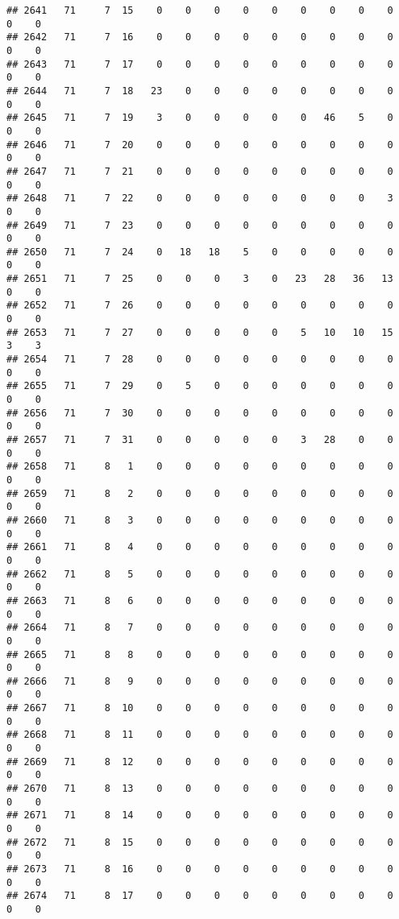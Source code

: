 \documentclass[]{article}
\begin{document}
\begin{verbatim}
## 2641   71     7  15    0    0    0    0    0    0    0    0    0    0    0
## 2642   71     7  16    0    0    0    0    0    0    0    0    0    0    0
## 2643   71     7  17    0    0    0    0    0    0    0    0    0    0    0
## 2644   71     7  18   23    0    0    0    0    0    0    0    0    0    0
## 2645   71     7  19    3    0    0    0    0    0   46    5    0    0    0
## 2646   71     7  20    0    0    0    0    0    0    0    0    0    0    0
## 2647   71     7  21    0    0    0    0    0    0    0    0    0    0    0
## 2648   71     7  22    0    0    0    0    0    0    0    0    3    0    0
## 2649   71     7  23    0    0    0    0    0    0    0    0    0    0    0
## 2650   71     7  24    0   18   18    5    0    0    0    0    0    0    0
## 2651   71     7  25    0    0    0    3    0   23   28   36   13    0    0
## 2652   71     7  26    0    0    0    0    0    0    0    0    0    0    0
## 2653   71     7  27    0    0    0    0    0    5   10   10   15    3    3
## 2654   71     7  28    0    0    0    0    0    0    0    0    0    0    0
## 2655   71     7  29    0    5    0    0    0    0    0    0    0    0    0
## 2656   71     7  30    0    0    0    0    0    0    0    0    0    0    0
## 2657   71     7  31    0    0    0    0    0    3   28    0    0    0    0
## 2658   71     8   1    0    0    0    0    0    0    0    0    0    0    0
## 2659   71     8   2    0    0    0    0    0    0    0    0    0    0    0
## 2660   71     8   3    0    0    0    0    0    0    0    0    0    0    0
## 2661   71     8   4    0    0    0    0    0    0    0    0    0    0    0
## 2662   71     8   5    0    0    0    0    0    0    0    0    0    0    0
## 2663   71     8   6    0    0    0    0    0    0    0    0    0    0    0
## 2664   71     8   7    0    0    0    0    0    0    0    0    0    0    0
## 2665   71     8   8    0    0    0    0    0    0    0    0    0    0    0
## 2666   71     8   9    0    0    0    0    0    0    0    0    0    0    0
## 2667   71     8  10    0    0    0    0    0    0    0    0    0    0    0
## 2668   71     8  11    0    0    0    0    0    0    0    0    0    0    0
## 2669   71     8  12    0    0    0    0    0    0    0    0    0    0    0
## 2670   71     8  13    0    0    0    0    0    0    0    0    0    0    0
## 2671   71     8  14    0    0    0    0    0    0    0    0    0    0    0
## 2672   71     8  15    0    0    0    0    0    0    0    0    0    0    0
## 2673   71     8  16    0    0    0    0    0    0    0    0    0    0    0
## 2674   71     8  17    0    0    0    0    0    0    0    0    0    0    0

\end{verbatim}
\end{document}
